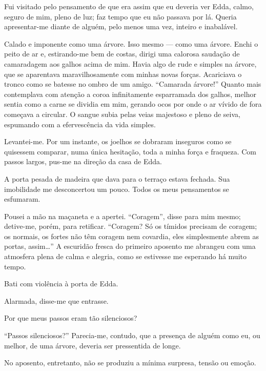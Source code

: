 Fui visitado pelo pensamento de que era assim que eu deveria ver Edda, calmo,
seguro de mim, pleno de luz; faz tempo que eu não passava por lá. Queria
apresentar-me diante de alguém, pelo menos uma vez, inteiro e inabalável.

Calado e imponente como uma árvore. Isso mesmo --- como uma árvore. Enchi o
peito de ar e, estirando-me bem de costas, dirigi uma calorosa saudação de
camaradagem aos galhos acima de mim. Havia algo de rude e simples na árvore,
que se aparentava maravilhosamente com minhas novas forças. Acariciava o
tronco como se batesse no ombro de um amigo. ``Camarada árvore!'' Quanto mais
contemplava com atenção a coroa infinitamente esparramada dos galhos, melhor
sentia como a carne se dividia em mim, gerando ocos por onde o ar vívido de
fora começava a circular. O sangue subia pelas veias majestoso e pleno de
seiva, espumando com a efervescência da vida simples.

Levantei-me. Por um instante, os joelhos se dobraram inseguros como se
quisessem comparar, numa única hesitação, toda a minha força e fraqueza. Com
passos largos, pus-me na direção da casa de Edda.

A porta pesada de madeira que dava para o terraço estava fechada. Sua
imobilidade me desconcertou um pouco. Todos os meus pensamentos se
esfumaram.

Pousei a mão na maçaneta e a apertei. ``Coragem'', disse para mim mesmo;
detive-me, porém, para retificar. ``Coragem? Só os tímidos precisam de
coragem; os normais, os fortes não têm coragem nem covardia, eles
simplesmente abrem as portas, assim\ldots{}'' A escuridão fresca do primeiro
aposento me abrangeu com uma atmosfera plena de calma e alegria, como se
estivesse me esperando há muito tempo.


Bati com violência à porta de Edda.

Alarmada, disse-me que entrasse.

Por que meus passos eram tão silenciosos?

``Passos silenciosos?'' Parecia-me, contudo, que a presença de alguém como eu,
ou melhor, de uma árvore, deveria ser pressentida de longe.

No aposento, entretanto, não se produziu a mínima surpresa, tensão ou emoção.

